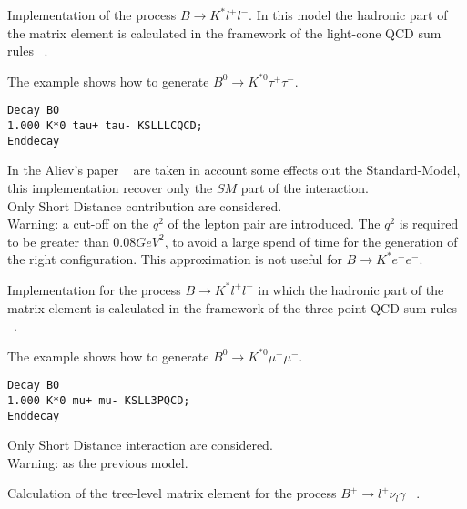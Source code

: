 \label{KSLLLCQCD}



\Expl
Implementation of the process $B\rightarrow K^* l^+ l^-$.
In this model the hadronic part of the matrix element is 
calculated in the framework of the light-cone QCD
sum rules ~\cite{Aliev97}.
 
\Example
The example shows how to generate $B^0\rightarrow K^{*0} \tau^+ \tau^-$.
\begin{verbatim}
Decay B0
1.000 K*0 tau+ tau- KSLLLCQCD;
Enddecay
\end{verbatim}

\Notes
In the Aliev's paper ~\cite{Aliev97} are taken in account some
effects out the Standard-Model, this implementation recover only
the $SM$ part of the interaction. \\
Only Short Distance contribution are considered.\\
Warning: a cut-off on the $q^2$ of the lepton pair are introduced. 
The $q^2$ is required to be greater than $0.08 GeV^2$, 
to avoid a large spend of time for the generation of the 
right configuration. This approximation is 
not useful for $B\rightarrow K^* e^+ e^-$.   





\label{KSLL3PQCD}



\Expl
Implementation for the process $B\rightarrow K^* l^+ l^-$ in which the hadronic 
part of the matrix element is calculated in the framework of the three-point QCD 
sum rules ~\cite{Colangelo96}.
 
\Example
The example shows how to generate $B^0\rightarrow K^{*0} \mu^+ \mu^-$.
\begin{verbatim}
Decay B0
1.000 K*0 mu+ mu- KSLL3PQCD;
Enddecay
\end{verbatim}

\Notes
Only Short Distance interaction are considered.\\
Warning: as the previous model.



\label{lnugamma}




\Expl
Calculation of the tree-level matrix element for the process ${ B^{+}} \rightarrow l^{+} \nu_{l} \gamma$ 
  ~\cite{Korchemsky00}.
 

